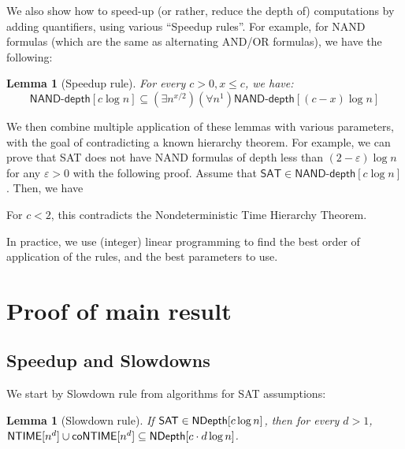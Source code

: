 \documentclass[a4paper, 11pt]{article}
\theoremstyle{plain}
\newtheorem{lemma}[theorem]{Lemma}
\theoremstyle{definition}
\theoremstyle{remark}
\newcommand{\eps}{\varepsilon}%
\newcommand{\NTIME}{\textsf{NTIME}}%
\newcommand{\coNTIME}{\textsf{coNTIME}}%
\newcommand{\SAT}{\textsf{SAT}}%
\newcommand{\ND}{\textsf{NDepth}}%
\newcommand{\NDL}[1]{\ensuremath\ND[ #1 \log n]}%
\begin{document}
We also show how to speed-up (or rather, reduce the depth of) computations by adding quantifiers, 
using various ``Speedup rules''. 
For example, for NAND formulas (which are the same as alternating AND/OR formulas), we have the following:
\begin{lemma}[Speedup rule]
	For every $c > 0, x \leq c$, we have:
	\[\textsf{NAND-depth}[c \log n] \subseteq (\exists n^{x/2}) (\forall n^1) \textsf{NAND-depth}[(c-x) \log n]\]
\end{lemma}

We then combine multiple application of these lemmas with various parameters,
with the goal of contradicting a known hierarchy theorem.
For example, we can prove that SAT does not have NAND formulas 
of depth less than $(2-\eps) \log n$ for any $\eps > 0$ with the following proof.
Assume that $\SAT\in \textsf{NAND-depth}[c \log n]$.
Then, we have
For $c < 2$, this contradicts the Nondeterministic Time Hierarchy Theorem.

In practice, we use (integer) linear programming to find the best order of application
of the rules, and the best parameters to use.

\section{Proof of main result}

\subsection{Speedup and Slowdowns}
We start by Slowdown rule from algorithms for SAT assumptions:
\begin{lemma}[Slowdown rule]\label{lemma:slowdown}
	If $\SAT{}\in \NDL{c}$, then for every $d > 1$, $\NTIME[n^d] \cup \coNTIME[n^d] \subseteq \NDL{c\cdot d}$.
\end{lemma}
\end{document}
